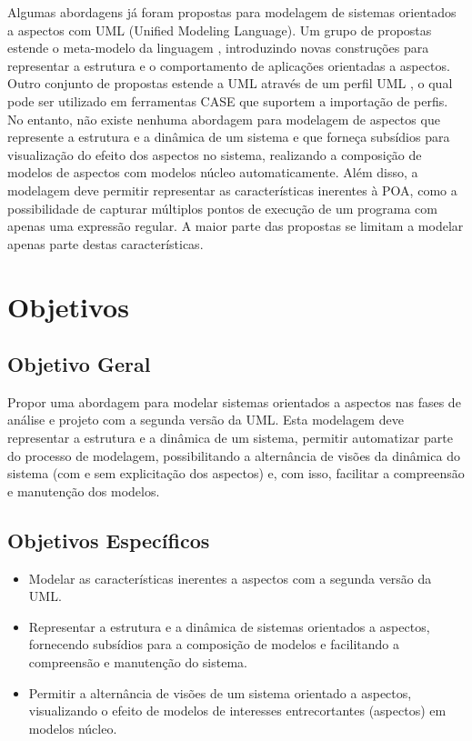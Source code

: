 Algumas abordagens já foram propostas para modelagem de sistemas orientados a aspectos com UML (Unified Modeling
Language)\cite{uml:05}. Um grupo de propostas estende o meta-modelo da linguagem
\cite{Kienzle:2009:AMM:1509239.1509252} \cite{theme:04} \cite{Stein02onrepresenting} \cite{Klein:2007:WMA:1805812.1805819} \cite{Jacobson:2004:ASD:1062430} \cite{france:06}, introduzindo novas construções para representar a estrutura e o comportamento de aplicações orientadas a aspectos. Outro conjunto de propostas estende a UML através de um perfil UML \cite{Evermann:2007:MSP:1229375.1229379} \cite{Cottenier06themotorola} \cite{Cui:2009:MIA:1529282.1529377}, o qual
pode ser utilizado em ferramentas CASE que suportem a importação de perfis. No entanto, não existe nenhuma abordagem para modelagem de aspectos que
represente a estrutura e a dinâmica de um sistema e que forneça subsídios para visualização do efeito dos aspectos no sistema, realizando a
composição de modelos de aspectos com modelos núcleo automaticamente. Além disso, a modelagem deve permitir representar as características
inerentes à POA, como a possibilidade de capturar múltiplos pontos de execução de um programa com apenas uma expressão regular. A maior parte das propostas se
limitam a modelar apenas parte destas características.

\section{Objetivos}

\subsection{Objetivo Geral}

Propor uma abordagem para modelar sistemas orientados a aspectos nas fases de análise e projeto com a segunda versão da UML. Esta modelagem deve
representar a estrutura e a dinâmica de um sistema, permitir automatizar parte do processo de modelagem, possibilitando a alternância de visões da
dinâmica do sistema (com e sem explicitação dos aspectos) e, com isso, facilitar a compreensão e manutenção dos modelos.

\subsection{Objetivos Específicos}

\begin{itemize}
  \item Modelar as características inerentes a aspectos com a segunda versão da UML.
  \item Representar a estrutura e a dinâmica de sistemas orientados a aspectos, fornecendo subsídios para a composição de modelos e facilitando 
  a compreensão e manutenção do sistema.
  \item Permitir a alternância de visões de um sistema orientado a aspectos, visualizando o efeito de modelos de
  interesses entrecortantes (aspectos) em modelos núcleo.
\end{itemize}

